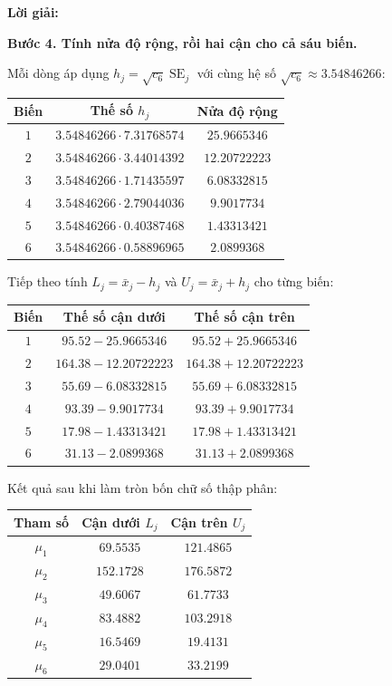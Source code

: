 \documentclass[11pt,a4paper]{article}
\newenvironment{solution}{%
  \par\medskip\noindent\textbf{Lời giải:}\par\nobreak\smallskip\noindent\ignorespaces
}{\par}
\newcommand{\step}[2]{\par\medskip\noindent\textbf{Bước #1. #2}\par\nopagebreak[4]\smallskip\noindent}
\begin{document}
\begin{solution}
\begin{enumerate}[label=\textbf{\alph*)}]
\step{4}{Tính nửa độ rộng, rồi hai cận cho cả sáu biến.}
Mỗi dòng áp dụng $h_j=\sqrt{c_6}\operatorname{SE}_j$ với cùng hệ số
$\sqrt{c_6}\approx3.54846266$:
\begin{center}
\small
\begin{tabular}{ccc}
\toprule
Biến & Thế số $h_j$ & Nửa độ rộng\\
\midrule
$1$ & $3.54846266\cdot7.31768574$ & $25.9665346$\\
$2$ & $3.54846266\cdot3.44014392$ & $12.20722223$\\
$3$ & $3.54846266\cdot1.71435597$ & $6.08332815$\\
$4$ & $3.54846266\cdot2.79044036$ & $9.9017734$\\
$5$ & $3.54846266\cdot0.40387468$ & $1.43313421$\\
$6$ & $3.54846266\cdot0.58896965$ & $2.0899368$\\
\bottomrule
\end{tabular}
\end{center}
Tiếp theo tính $L_j=\bar{x}_j-h_j$ và $U_j=\bar{x}_j+h_j$ cho từng biến:
\begin{center}
\small
\setlength{\tabcolsep}{4pt}
\begin{tabular}{ccc}
\toprule
Biến & Thế số cận dưới & Thế số cận trên\\
\midrule
$1$ & $95.52-25.9665346$ & $95.52+25.9665346$\\
$2$ & $164.38-12.20722223$ & $164.38+12.20722223$\\
$3$ & $55.69-6.08332815$ & $55.69+6.08332815$\\
$4$ & $93.39-9.9017734$ & $93.39+9.9017734$\\
$5$ & $17.98-1.43313421$ & $17.98+1.43313421$\\
$6$ & $31.13-2.0899368$ & $31.13+2.0899368$\\
\bottomrule
\end{tabular}
\end{center}
\begin{samepage}
Kết quả sau khi làm tròn bốn chữ số thập phân:
\begin{center}
\begin{tabular}{ccc}
\toprule
Tham số & Cận dưới $L_j$ & Cận trên $U_j$\\
\midrule
$\mu_1$ & $69.5535$ & $121.4865$\\
$\mu_2$ & $152.1728$ & $176.5872$\\
$\mu_3$ & $49.6067$ & $61.7733$\\
$\mu_4$ & $83.4882$ & $103.2918$\\
$\mu_5$ & $16.5469$ & $19.4131$\\
$\mu_6$ & $29.0401$ & $33.2199$\\
\bottomrule
\end{tabular}
\end{center}
\end{samepage}


\end{enumerate}
\end{solution}
\end{document}

